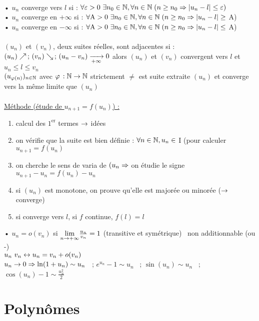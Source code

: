 \documentclass[12 pt]{exampleclass}
\begin{document}
\begin{flushleft}
\begin{doublespace}
	\text{ }\\
	• $u_n$ converge vers $l$ si : $\forall \varepsilon > 0 \ \exists n_0\in \mathbb{N} , \forall n\in \mathbb{N} \; (n\geq n_0 \Rightarrow |u_n - l| \leq \varepsilon )$\\
	• $u_n$ converge en $+\infty$ si : $\forall \text{A} > 0 \ \exists n_0\in \mathbb{N} , \forall n\in \mathbb{N} \; (n\geq n_0 \Rightarrow |u_n - l| \geq$ A)\\
	• $u_n$ converge en $-\infty$ si : $\forall \text{A} > 0 \ \exists n_0\in \mathbb{N} , \forall n\in \mathbb{N} \; (n\geq n_0 \Rightarrow |u_n - l| \leq$ A)\\
	\text{ }\\
	$(u_n)$ et $(v_n)$, deux suites réelles, sont adjacentes si : $(u_n) \nearrow \, ; \, (v_n) \searrow \, ; \, (u_n - v_n) \xrightarrow[+\infty]{} 0$ alors $(u_n)$ et $(v_n)$ convergent vers $l$ et $u_n\leq l \leq v_n$\\
	$(u_{\varphi (n)} )_{n\in \mathbb{N}}$ avec $\varphi \, : \mathbb{N} \rightarrow \mathbb{N}$ strictement $\ne$ est suite extraite $(u_n)$ et converge vers la même limite que $(u_n)$\\
	\text{ }\\
	\underline{Méthode (étude de $u_{n+1} = f(u_n)$) :}\\
	\begin{enumerate}
		\item calcul des $1^{\text{er}}$ termes $\rightarrow$ idées
		\item on vérifie que la suite est bien définie : $\forall n\in \mathbb{N} , u_n\in$ I (pour calculer $u_{n+1} = f(u_n)$
		\item on cherche le sens de varia de $(u_n \Rightarrow$ on étudie le signe $u_{n+1} - u_n = f(u_n) - u_n$
		\item si $(u_n)$ est monotone, on prouve qu'elle est majorée ou minorée ($\rightarrow$ converge)
		\item si converge vers $l$, si $f$ continue, $f(l) = l$
	\end{enumerate}
	• $u_n = o (v_n)$ si $\underset{n \rightarrow +\infty}{\text{lim}} \frac{u_n}{v_n} = 1$ (transitive et symétrique) \ non additionnable (ou -)\\
	$u_n ~ v_n \leftrightarrow u_n = v_n + o (v_n)$\\
	$u_n \rightarrow 0 \Rightarrow \ln(1+u_n) \sim u_n$ \ ; $e^{u_n} - 1 \sim u_n$ \ ; $\sin(u_n) \sim u_n$ \ ; $\cos(u_n) - 1 \sim \frac{u_n^2}{2}$\\

\end{doublespace}
\end{flushleft}

\section{Polynômes}
\end{document}
